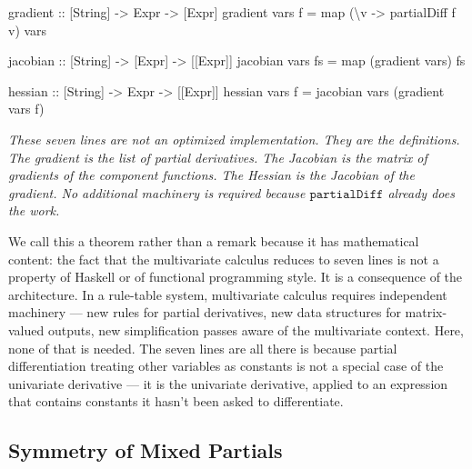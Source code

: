 \documentclass[12pt]{article}
\newenvironment{Shaded}{}{}
\newcommand{\NormalTok}[1]{#1}
\newcommand{\FunctionTok}[1]{#1}
\newcommand{\OtherTok}[1]{#1}
\newcommand{\DataTypeTok}[1]{#1}
\begin{document}
\begin{Shaded}
\begin{Highlighting}[]
\OtherTok{gradient ::}\NormalTok{ [}\DataTypeTok{String}\NormalTok{] }\OtherTok{{-}\textgreater{}} \DataTypeTok{Expr} \OtherTok{{-}\textgreater{}}\NormalTok{ [}\DataTypeTok{Expr}\NormalTok{]}
\NormalTok{gradient vars f }\OtherTok{=} \FunctionTok{map}\NormalTok{ (\textbackslash{}v }\OtherTok{{-}\textgreater{}}\NormalTok{ partialDiff f v) vars}

\OtherTok{jacobian ::}\NormalTok{ [}\DataTypeTok{String}\NormalTok{] }\OtherTok{{-}\textgreater{}}\NormalTok{ [}\DataTypeTok{Expr}\NormalTok{] }\OtherTok{{-}\textgreater{}}\NormalTok{ [[}\DataTypeTok{Expr}\NormalTok{]]}
\NormalTok{jacobian vars fs }\OtherTok{=} \FunctionTok{map}\NormalTok{ (gradient vars) fs}

\OtherTok{hessian ::}\NormalTok{ [}\DataTypeTok{String}\NormalTok{] }\OtherTok{{-}\textgreater{}} \DataTypeTok{Expr} \OtherTok{{-}\textgreater{}}\NormalTok{ [[}\DataTypeTok{Expr}\NormalTok{]]}
\NormalTok{hessian vars f }\OtherTok{=}\NormalTok{ jacobian vars (gradient vars f)}
\end{Highlighting}
\end{Shaded}

\emph{These seven lines are not an optimized implementation. They are
the definitions. The gradient is the list of partial derivatives. The
Jacobian is the matrix of gradients of the component functions. The
Hessian is the Jacobian of the gradient. No additional machinery is
required because \(\mathtt{partialDiff}\) already does the work.}

We call this a theorem rather than a remark because it has mathematical
content: the fact that the multivariate calculus reduces to seven lines
is not a property of Haskell or of functional programming style. It is a
consequence of the architecture. In a rule-table system, multivariate
calculus requires independent machinery --- new rules for partial
derivatives, new data structures for matrix-valued outputs, new
simplification passes aware of the multivariate context. Here, none of
that is needed. The seven lines are all there is because partial
differentiation treating other variables as constants is not a special
case of the univariate derivative --- it is the univariate derivative,
applied to an expression that contains constants it hasn't been asked to
differentiate.




\subsection{Symmetry of Mixed
Partials}\label{symmetry-of-mixed-partials}
\end{document}
